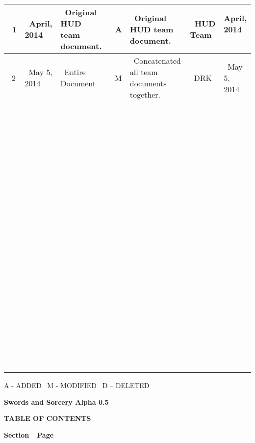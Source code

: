 \begin{flushleft}
\begin{supertabular}{|m{0.5462598in}|m{0.6712598in}|m{1.4212599in}|m{0.23375985in}|m{1.7962599in}|m{0.7337598in}|m{0.6295598in}|}
\\\hline
~1
 &
~April, 2014
 &
~Original HUD team document.
 &
~A
 &
~Original HUD team document.
 &
~HUD Team
 &April, 2014
~
\\\hline
~2
 &
~May 5, 2014
 &
~Entire Document
 &
~M
 &
~Concatenated all team documents together.
 &
~DRK
 &
~May 5, 2014
\\\hline
~
 &
~
 &
~
 &
~
 &
~
 &
~
 &
~
\\\hline
~
 &
~
 &
~
 &
~
 &
~
 &
~
 &
~
\\\hline
~
 &
~
 &
~
 &
~
 &
~
 &
~
 &
~
\\\hline
~
 &
~
 &
~
 &
~
 &
~
 &
~
 &
~
\\\hline
~
 &
~
 &
~
 &
~
 &
~
 &
~
 &
~
\\\hline
~
 &
~
 &
~
 &
~
 &
~
 &
~
 &
~
\\\hline
~
 &
~
 &
~
 &
~
 &
~
 &
~
 &
~
\\\hline
~
 &
~
 &
~
 &
~
 &
~
 &
~
 &
~
\\\hline
~
 &
~
 &
~
 &
~
 &
~
 &
~
 &
~
\\\hline
~
 &
~
 &
~
 &
~
 &
~
 &
~
 &
~
\\\hline
~
 &
~
 &
~
 &
~
 &
~
 &
~
 &
~
\\\hline
~
 &
~
 &
~
 &
~
 &
~
 &
~
 &
~
\\\hline
~
 &
~
 &
~
 &
~
 &
~
 &
~
 &
~
\\\hline
~
 &
~
 &
~
 &
~
 &
~
 &
~
 &
~
\\\hline
~
 &
~
 &
~
 &
~
 &
~
 &
~
 &
~
\\\hline
~
 &
~
 &
~
 &
~
 &
~
 &
~
 &
~
\\\hline
~
 &
~
 &
~
 &
~
 &
~
 &
~
 &
~
\\\hline
~
 &
~
 &
~
 &
~
 &
~
 &
~
 &
~
\\\hline
~
 &
~
 &
~
 &
~
 &
~
 &
~
 &
~
\\\hline
\end{supertabular}
\end{flushleft}
{\color{black}
A - ADDED \ M - MODIFIED \ D -- DELETED}

{\centering{}\bfseries\color{black}
Swords and Sorcery Alpha 0.5
\par}

\pagebreak

{\centering{}\bfseries\color{black}
TABLE OF CONTENTS
\par}

{\bfseries\color{black}
Section\ \ Page}

